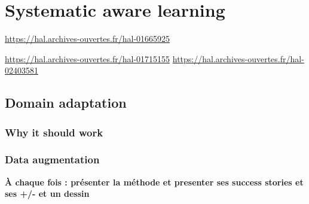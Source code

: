 
\chapter{Systematic aware learning}  %
\label{chap:sota}

\ifpdf
    \graphicspath{{Chapter2/Figs/Raster/}{Chapter2/Figs/PDF/}{Chapter2/Figs/}}
\else
    \graphicspath{{Chapter2/Figs/Vector/}{Chapter2/Figs/}}
\fi



\url{https://hal.archives-ouvertes.fr/hal-01665925}


\url{https://hal.archives-ouvertes.fr/hal-01715155}
\url{https://hal.archives-ouvertes.fr/hal-02403581}
\url{}



\section{Domain adaptation} %
\label{sec:domain_adaptation}


\subsection{Why it should work} %
\label{sub:why_it_should_work}







\subsection{Data augmentation} %
\label{sub:data_augmentation}




\textbf{À chaque fois : présenter la méthode et presenter ses success stories et ses +/- et un dessin}




